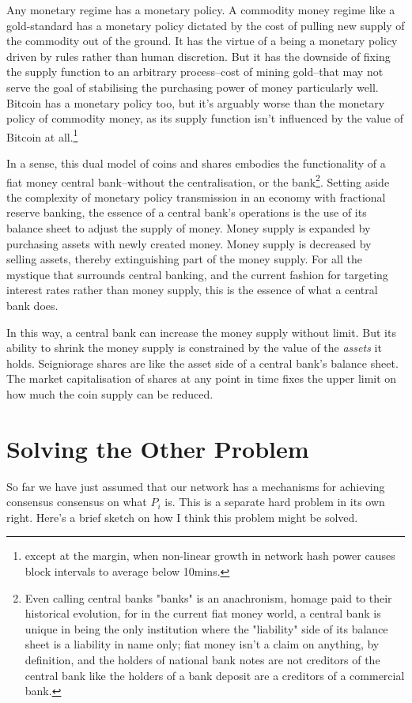 \documentclass[twocolumn]{article}
\begin{document}
Any monetary regime has a monetary policy. A commodity money regime
like a gold-standard has a monetary policy dictated by the cost of
pulling new supply of the commodity out of the ground. It has the
virtue of a being a monetary policy driven by rules rather than human
discretion. But it has the downside of fixing the supply function to
an arbitrary process--cost of mining gold--that may not serve the goal
of stabilising the purchasing power of money particularly
well. Bitcoin has a monetary policy too, but it's arguably worse than
the monetary policy of commodity money, as its supply function isn't
influenced by the value of Bitcoin at all.\footnote{except at the
  margin, when non-linear growth in network hash power causes block
  intervals to average below 10mins.}

In a sense, this dual model of coins and shares embodies the
functionality of a fiat money central bank--without the
centralisation, or the bank\footnote{Even calling central banks
  "banks" is an anachronism, homage paid to their historical
  evolution, for in the current fiat money world, a central bank is
  unique in being the only institution where the "liability" side of
  its balance sheet is a liability in name only; fiat money isn't a
  claim on anything, by definition, and the holders of national bank
  notes are not creditors of the central bank like the holders of a
  bank deposit are a creditors of a commercial bank.}. Setting aside
the complexity of monetary policy transmission in an economy with
fractional reserve banking, the essence of a central bank's operations
is the use of its balance sheet to adjust the supply of money. Money
supply is expanded by purchasing assets with newly created
money. Money supply is decreased by selling assets, thereby
extinguishing part of the money supply. For all the mystique that
surrounds central banking, and the current fashion for targeting
interest rates rather than money supply, this is the essence of what a
central bank does.

In this way, a central bank can increase the money supply without
limit. But its ability to shrink the money supply is constrained by
the value of the \emph{assets} it holds. Seigniorage shares are like
the asset side of a central bank's balance sheet. The market
capitalisation of shares at any point in time fixes the upper limit on
how much the coin supply can be reduced.

\section*{Solving the Other Problem}
So far we have just assumed that our network has a mechanisms for
achieving consensus consensus on what $P_{i}$ is. This is a separate
hard problem in its own right. Here's a brief sketch on how I think
this problem might be solved. 
\end{document}
